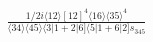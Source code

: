 \documentclass[varwidth, border=5pt]{standalone}
\begin{document}
\begin{my}
$\begin{gathered}
\scriptscriptstyle\frac{1/2i\langle12\rangle[12]^4\langle16\rangle\langle35\rangle^4}{\langle34\rangle\langle45\rangle\langle3|1+2|6]\langle5|1+6|2]s_{345}}
\end{gathered}$
\end{my}
\end{document}
